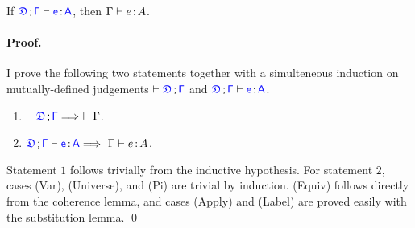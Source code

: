 \begin{lemma} If $\targetcon \vdash \itemtype{e}{A}$, then $\Gamma \vdash e \hspace{0.5mm}{:}\hspace{0.5mm} A$.
\paragraph{Proof.} I prove the following two statements together with a simulteneous induction on mutually-defined judgements $\vdash \targetcon$ and $\targetcon \vdash \itemtype{e}{A}$.
\begin{enumerate}
	\item $\vdash \targetcon \Longrightarrow\ \vdash \Gamma$.
	\item $\targetcon \vdash \itemtype{e}{A} \Longrightarrow\ {\Gamma} \vdash {e} \goodcolon {A}$.
\end{enumerate}
Statement $1$ follows trivially from the inductive hypothesis. For statement $2$, cases (Var), (Universe), and (Pi) are trivial by induction. (Equiv) follows directly from the coherence lemma, and cases (Apply) and (Label) are proved easily with the substitution lemma. \qed

\end{lemma}





